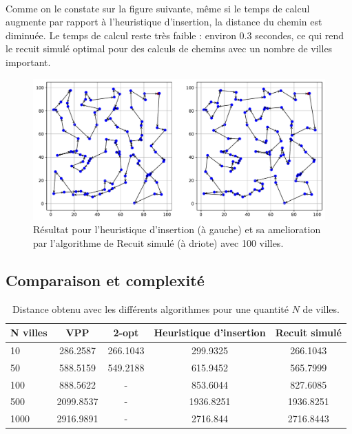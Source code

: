 \documentclass[a4paper,11pt,fleqn]{article}
\begin{document}
\paragraph{}
Comme on le constate sur la figure suivante, même si le temps de calcul augmente par rapport à l'heuristique d'insertion, la distance du chemin est diminuée. 
Le temps de calcul reste très faible : environ 0.3 secondes, ce qui rend le recuit simulé optimal pour des calculs de chemins avec un nombre de villes important.
\begin{figure}[H]
    \centering
    \includegraphics[width=\textwidth]{images/recuit_simule.pdf}
    \caption{Résultat pour l'heuristique d'insertion (à gauche) et sa amelioration par l'algorithme de Recuit simulé (à driote) avec 100 villes.}
    \label{fig:recuit}
\end{figure}

\subsection*{Comparaison et complexité}

\begin{table}[H]
    \centering
    \caption{Distance obtenu avec les différents algorithmes pour une quantité $N$ de villes.}
    \label{tab:distances}
    \begin{tabular}{lcccc}
        \hline
        N villes & VPP & 2-opt & Heuristique d'insertion & Recuit simulé \\ \hline\hline
        10  & 286.2587  & 266.1043  & 299.9325 & 266.1043 \\
        50  & 588.5159  & 549.2188  & 615.9452 & 565.7999 \\
        100 & 888.5622 & - & 853.6044 & 827.6085 \\
        500 & 2099.8537 & - & 1936.8251 & 1936.8251 \\
        1000 & 2916.9891 & - & 2716.844 & 2716.8443  \\ \hline
    \end{tabular}
\end{table}
\end{document}
